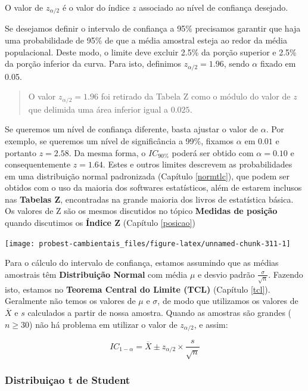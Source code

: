 \documentclass[
]{book}
\begin{document}
O valor de \(z_{\alpha/2}\) é o valor do índice \(z\) associado ao nível de confiança desejado.

Se desejamos definir o intervalo de confiança a 95\% precisamos garantir que haja uma probabilidade de 95\% de que a média amostral esteja ao redor da média populacional. Deste modo, o limite deve excluir 2.5\% da porção superior e 2.5\% da porção inferior da curva. Para isto, definimos \(z_{\alpha/2} = 1.96\), sendo \(\alpha\) fixado em 0.05.

\begin{quote}
O valor \(z_{\alpha/2} = 1.96\) foi retirado da Tabela Z como o módulo do valor de \(z\) que delimida uma área inferior igual a \(0.025\).
\end{quote}

Se queremos um nível de confiança diferente, basta ajustar o valor de \(\alpha\). Por exemplo, se queremos um nível de significância a 99\%, fixamos \(\alpha\) em \(0.01\) e portanto \(z = 2.58\). Da mesma forma, o \(IC_{90\%}\) poderá ser obtido com \(\alpha = 0.10\) e consequentemente \(z = 1.64\). Estes e outros limites descrevem as probabilidades em uma distribuição normal padronizada (Capítulo \ref{normtlc}), que podem ser obtidos com o uso da maioria dos softwares estatísticos, além de estarem inclusos nas \textbf{Tabelas Z}, encontradas na grande maioria dos livros de estatística básica. Os valores de Z são os mesmos discutidos no tópico \textbf{Medidas de posição} quando discutimos os \textbf{Índice Z} (Capítulo \ref{posicao})

\begin{center}\texttt{[image: probest-cambientais\_files/figure-latex/unnamed-chunk-311-1]} \end{center}

Para o cálculo do intervalo de confiança, estamos assumindo que as médias amostrais têm \textbf{Distribuição Normal} com média \(\mu\) e desvio padrão \(\frac{\sigma}{\sqrt{n}}\). Fazendo isto, estamos no \textbf{Teorema Central do Limite (TCL)} (Capítulo \ref{tcl}). Geralmente não temos os valores de \(\mu\) e \(\sigma\), de modo que utilizamos os valores de \(\overline{X}\) e \(s\) calculados a partir de nossa amostra. Quando as amostras são grandes (\(n\ge{30}\)) não há problema em utilizar o valor de \(z_{\alpha/2}\), e assim:

\[IC_{1-\alpha} = \overline{X} \pm z_{\alpha/2} \times \frac{s}{\sqrt{n}}\]

\hypertarget{distribuiuxe7ao-t-de-student}{%
\subsubsection{Distribuiçao t de Student}\label{distribuiuxe7ao-t-de-student}}
\end{document}
